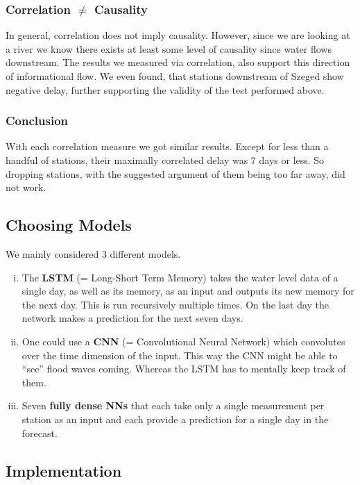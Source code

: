 \documentclass{article}
\newcommand{\tmstrong}[1]{\textbf{#1}}
\newenvironment{enumerateroman}{\begin{enumerate}[i.] }{\end{enumerate}}
\begin{document}
\subsubsection{Correlation $\neq$ Causality}

In general, correlation does not imply causality. However, since we are
looking at a river we know there exists at least some level of causality since
water flows downstream. The results we measured via correlation, also support
this direction of informational flow. We even found, that stations downstream
of Szeged show negative delay, further supporting the validity of the test
performed above.

\subsubsection{Conclusion}

With each correlation measure we got similar results. Except for less than a
handful of stations, their maximally correlated delay was 7 days or less. So
dropping stations, with the suggested argument of them being too far away, did
not work.

\subsection{Choosing Models}

We mainly considered 3 different models.
\begin{enumerateroman}
  \item The {\tmstrong{LSTM}} (= Long-Short Term Memory) takes the water level
  data of a single day, as well as its memory, as an input and outputs its new
  memory for the next day. This is run recursively multiple times. On the last
  day the network makes a prediction for the next seven days.
  
  \item One could use a {\tmstrong{CNN}} (= Convolutional Neural Network)
  which convolutes over the time dimension of the input. This way the CNN
  might be able to ``see'' flood waves coming. Whereas the LSTM has to
  mentally keep track of them.
  
  \item Seven {\tmstrong{fully dense NNs}} that each take only a single
  measurement per station as an input and each provide a prediction for a
  single day in the forecast.
\end{enumerateroman}

\subsection{Implementation}
\end{document}

